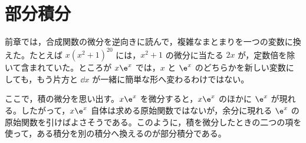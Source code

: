 \chapter{部分積分}\label{章:部分積分}

前章では，合成関数の微分を逆向きに読んで，複雑なまとまりを一つの変数に換えた。たとえば $x(x^2+1)^{20}$ には，$x^2+1$ の微分に当たる $2x$ が，定数倍を除いて含まれていた。ところが $x\e^x$ では，$x$ と $\e^x$ のどちらかを新しい変数にしても，もう片方と $\dd x$ が一緒に簡単な形へ変わるわけではない。

ここで，積の微分を思い出す。$x\e^x$ を微分すると，$x\e^x$ のほかに $\e^x$ が現れる。したがって，$x\e^x$ 自体は求める原始関数ではないが，余分に現れる $\e^x$ の原始関数を引けばよさそうである。このように，積を微分したときの二つの項を使って，ある積分を別の積分へ換えるのが部分積分である。

%
%
%
%
%
%
%
%
